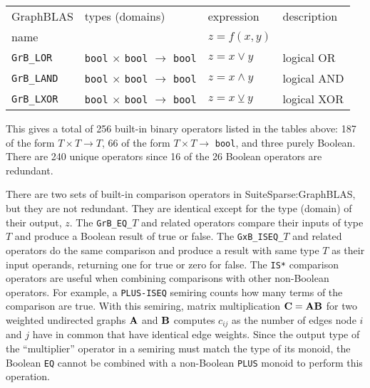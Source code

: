 \documentclass[12pt]{article}
\begin{document}
\vspace{0.2in}
{\footnotesize
\begin{tabular}{llll}
\hline
GraphBLAS             & types (domains)            & expression      & description \\
name                  &                            & $z=f(x,y)$      & \\
\hline
\verb'GrB_LOR'        & \verb'bool'
                        $\times$ \verb'bool'
                        $\rightarrow$ \verb'bool'  & $z = x \vee    y $ & logical OR \\
\verb'GrB_LAND'       & \verb'bool'
                        $\times$ \verb'bool'
                        $\rightarrow$ \verb'bool'  & $z = x \wedge  y $ & logical AND \\
\verb'GrB_LXOR'       & \verb'bool'
                        $\times$ \verb'bool'
                        $\rightarrow$ \verb'bool'  & $z = x \veebar y $ & logical XOR \\
\hline
\end{tabular}
}
\vspace{0.2in}

This gives a total of 256 built-in binary operators listed in the tables above:
187 of the form $T \times T \rightarrow T$, 66 of the form $T \times T
\rightarrow $ \verb'bool', and three purely Boolean.  There are 240 unique
operators since 16 of the 26 Boolean operators are redundant.

There are two sets of built-in comparison operators in SuiteSparse:Graph\-BLAS,
but they are not redundant.  They are identical except for the type (domain) of
their output, $z$.  The \verb'GrB_EQ_'$T$ and related operators compare their
inputs of type $T$ and produce a Boolean result of true or false.  The
\verb'GxB_ISEQ_'$T$ and related operators do the same comparison and produce a
result with same type $T$ as their input operands, returning one for true or
zero for false.  The \verb'IS*' comparison operators are useful when combining
comparisons with other non-Boolean operators.  For example, a \verb'PLUS-ISEQ'
semiring counts how many terms of the comparison are true.  With this semiring,
matrix multiplication ${\bf C=AB}$ for two weighted undirected graphs ${\bf A}$
and ${\bf B}$ computes $c_{ij}$ as the number of edges node $i$ and $j$ have in
common that have identical edge weights.  Since the output type of the
``multiplier'' operator in a semiring must match the type of its monoid, the
Boolean \verb'EQ' cannot be combined with a non-Boolean \verb'PLUS' monoid to
perform this operation.
\end{document}
